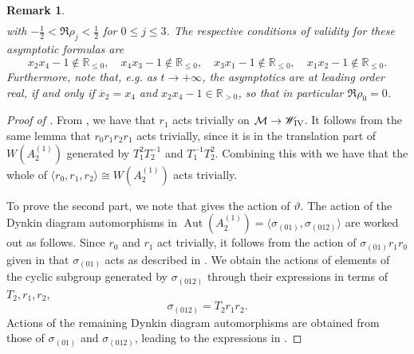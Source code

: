 \documentclass[a4paper,reqno]{amsart}
\numberwithin{equation}{section}
\DeclareMathOperator{\Aut}{Aut}
\newtheorem{remark}[theorem]{Remark}
\numberwithin{equation}{section}
\begin{document}
\begin{remark}
\begin{align*}
\end{align*}
with $-\frac{1}{2}<\Re\rho_j<\frac{1}{2}$ for $0\leq j\leq 3$. The respective conditions of validity for these asymptotic formulas are
\begin{equation*}
    x_2x_4-1\notin \mathbb{R}_{\leq 0},\quad  x_4x_3-1\notin \mathbb{R}_{\leq 0},\quad  x_3x_1-1\notin \mathbb{R}_{\leq 0},\quad  x_1x_2-1\notin \mathbb{R}_{\leq 0}.
\end{equation*}
Furthermore, note that, e.g. as $t\rightarrow+\infty$, the asymptotics are at leading order real, if and only if  $\overline{x}_2=x_4$ and $x_2x_4-1\in\mathbb{R}_{>0}$, so that in particular $\Re\rho_0=0$.
\end{remark}







\begin{proof}[Proof of ]
    From , we have that $r_1$ acts trivially on $\mathcal{M}\to \mathscr{W}_{\rm{IV}}$.
    It follows from the same lemma that $r_0r_1r_2r_1$ acts trivially, since it is in the translation part of $W(A_2^{(1)})$ generated by $T_1^{2}T_2^{-1}$ and $T_1^{-1}T_2^2$.
    Combining this with  we have that the whole of $\langle r_0,r_1, r_2\rangle \cong W(A_2^{(1)})$ acts trivially.


    To prove the second part, we note that  gives the action of $\vartheta$. The action of the Dynkin diagram automorphisms in $\Aut(A_2^{(1)})=\langle \sigma_{(01)},\sigma_{(012)}\rangle$ are worked out as follows. 
    Since $r_0$ and $r_1$ act trivially, it follows from the action of  $\sigma_{(01)}r_1r_0$ given in  that $\sigma_{(01)}$ acts as described in .
    We obtain the actions of elements of the cyclic subgroup generated by $\sigma_{(012)}$ through their expressions in terms of $T_2,r_1,r_2$, 
    $$\sigma_{(012)} = T_2r_1r_2.$$ 
    Actions of the remaining Dynkin diagram automorphisms are obtained from those of $\sigma_{(01)}$ and $\sigma_{(012)}$, leading to the expressions in .
\end{proof}
\end{document}
